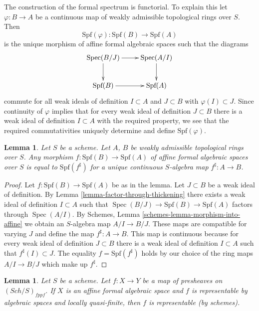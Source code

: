 \documentclass{stacks-project}
\theoremstyle{plain}
\newtheorem{lemma}[subsection]{Lemma}
\theoremstyle{definition}
\theoremstyle{remark}
\numberwithin{equation}{subsection}
\def\Spec{\mathop{\mathrm{Spec}}}
\def\Sch{\mathit{Sch}}
\begin{document}
\medskip\noindent
The construction of the formal spectrum is functorial. To explain this
let $\varphi : B \to A$ be a continuous map of weakly admissible
topological rings over $S$. Then
$$
\text{Spf}(\varphi) : \text{Spf}(B) \to \text{Spf}(A)
$$
is the unique morphism of affine formal algebraic spaces such that
the diagrams
$$
\xymatrix{
\Spec(B/J) \ar[d] \ar[r] & \Spec(A/I) \ar[d] \\
\text{Spf}(B) \ar[r] & \text{Spf}(A)
}
$$
commute for all weak ideals of definition $I \subset A$ and $J \subset B$
with $\varphi(I) \subset J$. Since continuity of $\varphi$
implies that for every weak ideal of definition $J \subset B$
there is a weak ideal of definition $I \subset A$ with the required
property, we see that the required commutativities uniquely
determine and define $\text{Spf}(\varphi)$.

\begin{lemma}
\label{lemma-morphism-between-formal-spectra}
Let $S$ be a scheme. Let $A$, $B$ be weakly admissible
topological rings over $S$. Any morphism $f : \text{Spf}(B) \to \text{Spf}(A)$
of affine formal algebraic spaces over $S$
is equal to $\text{Spf}(f^\sharp)$ for a unique continuous
$S$-algebra map $f^\sharp : A \to B$.
\end{lemma}

\begin{proof}
Let $f : \text{Spf}(B) \to \text{Spf}(A)$ be as in the lemma.
Let $J \subset B$ be a weak ideal of definition. By
Lemma \ref{lemma-factor-through-thickening}
there exists a weak ideal of definition $I \subset A$ such that
$\Spec(B/J) \to \text{Spf}(B) \to \text{Spf}(A)$
factors through $\Spec(A/I)$. By
Schemes, Lemma \ref{schemes-lemma-morphism-into-affine}
we obtain an $S$-algebra map $A/I \to B/J$.
These maps are compatible for varying $J$ and define the
map $f^\sharp : A \to B$. This map is continuous because
for every weak ideal of definition $J \subset B$ there is a
weak ideal of definition $I \subset A$ such that
$f^\sharp(I) \subset J$. The equality $f = \text{Spf}(f^\sharp)$
holds by our choice of the ring maps $A/I \to B/J$ which make up $f^\sharp$.
\end{proof}

\begin{lemma}
\label{lemma-presentation-representable}
Let $S$ be a scheme. Let $f : X \to Y$ be a map
of presheaves on $(\Sch/S)_{fppf}$. If $X$ is an affine formal algebraic
space and $f$ is representable by algebraic spaces and locally quasi-finite,
then $f$ is representable (by schemes).
\end{lemma}
\end{document}
